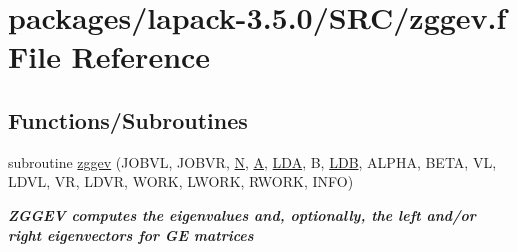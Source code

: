 \hypertarget{zggev_8f}{}\section{packages/lapack-\/3.5.0/\+S\+R\+C/zggev.f File Reference}
\label{zggev_8f}
\subsection*{Functions/\+Subroutines}
\begin{DoxyCompactItemize}
\item 
subroutine \hyperlink{group__complex16GEeigen_ga79fcce20c617429ccf985e6f123a6171}{zggev} (J\+O\+B\+V\+L, J\+O\+B\+V\+R, \hyperlink{polmisc_8c_a0240ac851181b84ac374872dc5434ee4}{N}, \hyperlink{classA}{A}, \hyperlink{example__user_8c_ae946da542ce0db94dced19b2ecefd1aa}{L\+D\+A}, B, \hyperlink{example__user_8c_a50e90a7104df172b5a89a06c47fcca04}{L\+D\+B}, A\+L\+P\+H\+A, B\+E\+T\+A, V\+L, L\+D\+V\+L, V\+R, L\+D\+V\+R, W\+O\+R\+K, L\+W\+O\+R\+K, R\+W\+O\+R\+K, I\+N\+F\+O)
\begin{DoxyCompactList}\small\item\em {\bfseries  Z\+G\+G\+E\+V computes the eigenvalues and, optionally, the left and/or right eigenvectors for G\+E matrices} \end{DoxyCompactList}\end{DoxyCompactItemize}
